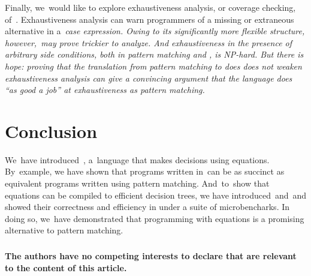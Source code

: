 \documentclass[runningheads]{llncs}
\begin{document}
    Finally, we~would like to explore exhaustiveness analysis, or coverage
    checking, of~\VMinus. %
    Exhaustiveness analysis can warn programmers of a missing or extraneous
    alternative in a~\it{case} expression. %
    Owing to its significantly more flexible structure,
    however,~\iffibf may prove trickier to analyze. %
    And exhaustiveness in the presence of arbitrary side conditions, both in
    pattern matching and \VMinus, is NP-hard. %
    But there is hope: proving that the translation from pattern matching to
    \VMinus does does not \textit{weaken} exhaustiveness analysis can give a
    convincing argument that the language does ``as good a job'' at exhaustiveness
    as pattern matching. 

    \section{Conclusion}

    We~have introduced~\VMinus, a~language that makes decisions using
    equations.%
    By~example, we have shown that programs written in~\VMinus can be as
    succinct as equivalent programs written using pattern matching. %
    And~to~show that equations can be compiled to efficient decision trees, we
    have introduced~\D and~\DTran and showed their correctness and efficiency in
    under a suite of microbencharks. In doing so, we~have demonstrated that
    programming with equations is a promising alternative to pattern matching. %
    
    

\begin{credits}

\subsubsection{\discintname}
\textbf{\small{The authors have no competing interests to declare that are relevant to the
content of this article.}}
\end{credits}
%
%
%



\newpage
\end{document}

